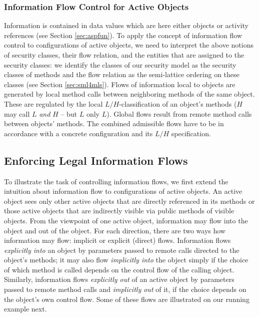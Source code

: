 \documentclass[10pt, conference, compsocconf]{IEEEtran}
\begin{document}
{\subsubsection*{Information Flow Control for Active Objects}
Information is contained in data values which are here either objects or activity references
(see Section \ref{sec:aspfun}).
To apply the concept of information flow control to configurations of active objects, we need to
interpret the above notions of security classes, their flow relation, and the entities that
are assigned to the security classes: we identify the classes of our security model 
as the security classes of methods and the flow relation as the semi-lattice ordering 
on these classes (see Section \ref{sec:sml4mls}). 
Flows of information local to objects are generated by local method calls between
neighboring methods of the same object. These are regulated by the local $L/H$-classification of an 
object's methods ($H$ may call $L$ {\it and} $H$ -- but $L$ only $L$). 
Global flows result from remote method calls between objects' methods.
The combined admissible flows have to be in accordance with a concrete 
configuration and its $L/H$ specification. 



\subsection{Enforcing Legal Information Flows}
To illustrate the task of controlling information flows, 
we first extend the intuition about information flow to configurations of active objects. 
An active object sees only other active objects that are directly referenced in its methods
or those active objects that are indirectly visible via public methods of visible objects.
From the viewpoint of one active object, 
information may flow into the object and out of the object.
For each direction, there are two ways how information may flow: implicit or explicit (direct) flows.
Information flows {\it explicitly into} an object by parameters passed to remote calls directed to 
the object's methods; it may also flow {\it implicitly into} the object simply if the choice
of which method is called depends on the control flow of the calling object. Similarly,
information flows {\it explicitly out} of an active object by parameters passed to remote method
calls and {\it implicitly out} of it, if the choice depends on the object's own control flow.
Some of these flows are illustrated on our running example next.

}
\end{document}
